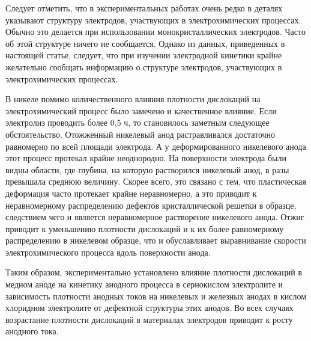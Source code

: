 Следует отметить, что в экспериментальных работах очень редко в
деталях указывают структуру электродов, участвующих в
электрохимических процессах. Обычно это делается при использовании
монокристаллических электродов. Часто об этой структуре ничего не
сообщается. Однако из данных, приведенных в настоящей статье,
следует, что при изучении электродной кинетики крайне желательно
сообщать информацию о структуре электродов, участвующих в
электрохимических процессах.

В никеле помимо количественного влияния плотности дислокаций на
электрохимический процесс было замечено и качественное влияние.
Если электролиз проводить более 0,5 ч, то становилось заметным
следующее обстоятельство. Отожженный никелевый анод растравливался
достаточно равномерно по всей площади электрода. А у
деформированного никелевого анода этот процесс протекал крайне
неоднородно. На поверхности электрода были видны области, где
глубина, на которую растворился никелевый анод, в разы превышала
среднюю величину. Скорее всего, это связано с тем, что
пластическая деформация часто протекает крайне неравномерно, а это
приводит к неравномерному распределению дефектов кристаллической
решетки в образце, следствием чего и является неравномерное
растворение никелевого анода. Отжиг приводит к уменьшению
плотности дислокаций и к их более равномерному распределению в
никелевом образце, что и обуславливает выравнивание скорости
электрохимического процесса вдоль поверхности анода.

\smallskip

 Таким образом, экспериментально установлено
влияние плотности дислокаций в медном аноде на кинетику анодного
процесса в сернокислом электролите и зависимость плотности анодных
токов на никелевых и железных анодах в кислом хлоридном
электролите от дефектной структуры этих анодов. Во всех случаях
возрастание плотности дислокаций в материалах электродов приводит
к росту анодного тока.

\phantom{1}\newpage

